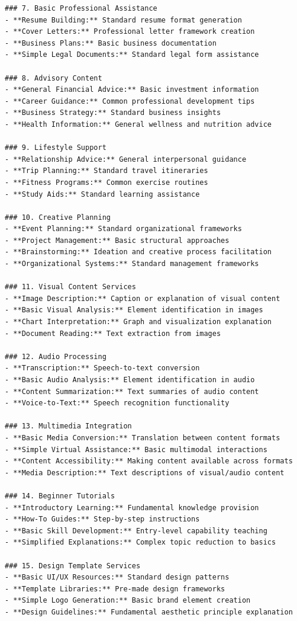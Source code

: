 \documentclass[12pt]{article}
\begin{document}
\begin{verbatim}
### 7. Basic Professional Assistance
- **Resume Building:** Standard resume format generation
- **Cover Letters:** Professional letter framework creation
- **Business Plans:** Basic business documentation
- **Simple Legal Documents:** Standard legal form assistance

### 8. Advisory Content
- **General Financial Advice:** Basic investment information
- **Career Guidance:** Common professional development tips
- **Business Strategy:** Standard business insights
- **Health Information:** General wellness and nutrition advice

### 9. Lifestyle Support
- **Relationship Advice:** General interpersonal guidance
- **Trip Planning:** Standard travel itineraries
- **Fitness Programs:** Common exercise routines
- **Study Aids:** Standard learning assistance

### 10. Creative Planning
- **Event Planning:** Standard organizational frameworks
- **Project Management:** Basic structural approaches
- **Brainstorming:** Ideation and creative process facilitation
- **Organizational Systems:** Standard management frameworks

### 11. Visual Content Services
- **Image Description:** Caption or explanation of visual content
- **Basic Visual Analysis:** Element identification in images
- **Chart Interpretation:** Graph and visualization explanation
- **Document Reading:** Text extraction from images

### 12. Audio Processing
- **Transcription:** Speech-to-text conversion
- **Basic Audio Analysis:** Element identification in audio
- **Content Summarization:** Text summaries of audio content
- **Voice-to-Text:** Speech recognition functionality

### 13. Multimedia Integration
- **Basic Media Conversion:** Translation between content formats
- **Simple Virtual Assistance:** Basic multimodal interactions
- **Content Accessibility:** Making content available across formats
- **Media Description:** Text descriptions of visual/audio content

### 14. Beginner Tutorials
- **Introductory Learning:** Fundamental knowledge provision
- **How-To Guides:** Step-by-step instructions
- **Basic Skill Development:** Entry-level capability teaching
- **Simplified Explanations:** Complex topic reduction to basics

### 15. Design Template Services
- **Basic UI/UX Resources:** Standard design patterns
- **Template Libraries:** Pre-made design frameworks
- **Simple Logo Generation:** Basic brand element creation
- **Design Guidelines:** Fundamental aesthetic principle explanation


\end{verbatim}
\end{document}
